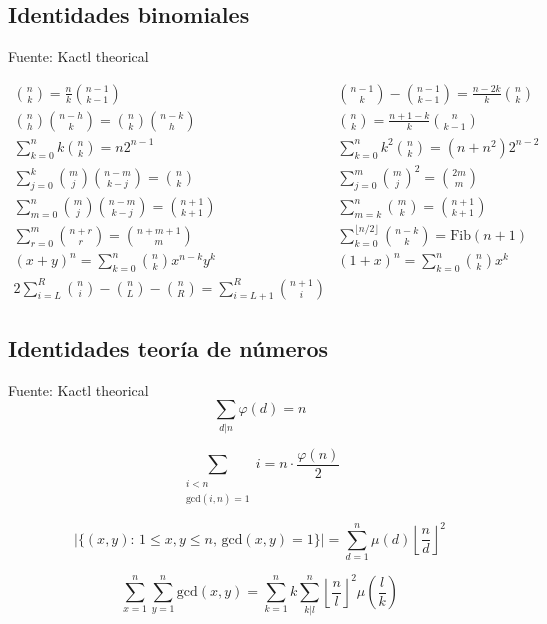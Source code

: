 \subsection{Identidades binomiales}
Fuente: Kactl theorical \\

\bigskip

$$
\begin{array}{cc}
\binom{n}{k} = \frac{n}{k}\binom{n-1}{k-1}
&
\binom{n-1}{k} - \binom{n-1}{k-1} = \frac{n - 2k}{k} \binom{n}{k}
\\[10pt]
\binom{n}{h}\binom{n-h}{k} = \binom{n}{k}\binom{n-k}{h} &
\binom{n}{k} = \frac{n+1-k}{k} \binom{n}{k-1}
\\[10pt]
\sum_{k = 0}^n k\binom{n}{k} = n 2^{n-1} &
\sum_{k = 0}^n k^2 \binom{n}{k} = (n + n^2)2^{n-2}
\\[10pt]
\sum_{j = 0}^k\binom{m}{j} \binom{n-m}{k-j} = \binom{n}{k} &
\sum_{j = 0}^m \binom{m}{j}^2 = \binom{2m}{m}
\\[10pt]
\sum_{m = 0}^n \binom{m}{j} \binom{n-m}{k-j} = \binom{n+1}{k+1} &
\sum_{m = k}^n \binom{m}{k} = \binom{n+1}{k+1}
\\[10pt]
\sum_{r = 0}^m \binom{n+r}{r} = \binom{n+m+1}{m} &
\sum_{k=0}^{\lfloor n/2 \rfloor} \binom{n-k}{k} = \text{Fib}(n+1)
\\[10pt]
(x + y)^{n} = \sum_{k=0}^{n} \binom{n}{k} x^{n-k} y^{k} &
(1 + x)^{n} = \sum_{k=0}^{n} \binom{n}{k} x^{k}
\\[10pt]
2\sum_{i = L}^R \binom{n}{i} - \binom{n}{L} - \binom{n}{R} = \sum_{i = L+1}^R \binom{n+1}{i}
\end{array}
$$

\subsection{Identidades teoría de números}
Fuente: Kactl theorical \\

$$ \sum_{d|n} \varphi(d) = n$$

$$ \sum_{\substack{i < n \\ \text{gcd}(i, n) = 1}} i = n \cdot \frac{\varphi(n)}{2} $$

$$ |\{(x, y) : \, 1 \leq x, y \leq n, \, \text{gcd}(x, y) = 1\}| = \sum_{d = 1}^n \mu(d) \left \lfloor \frac{n}{d} \right \rfloor^2$$

$$\sum_{x = 1}^n \sum_{y = 1}^n \text{gcd}(x, y)
= \sum_{k = 1}^n k \sum_{k|l}^{n} \left \lfloor \frac{n}{l} \right \rfloor^2 \mu\left(\frac{l}{k}\right)$$

